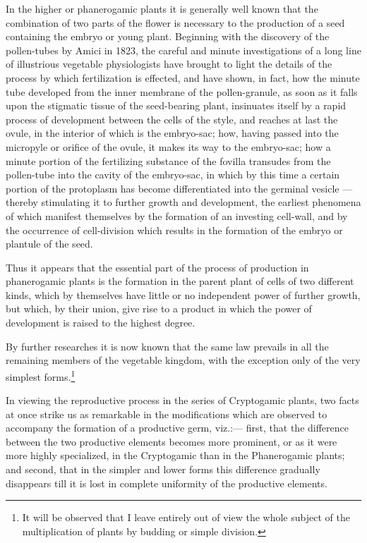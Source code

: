 \documentclass[a4paper, 11pt, oneside, english]{article}
\begin{document}
In the higher or phanerogamic plants it is generally well known that the combination of two parts of the flower is necessary to the production of a seed containing the embryo or young plant. Beginning with the discovery of the pollen-tubes by Amici in 1823, the careful and minute investigations of a long line of illustrious vegetable physiologists have brought to light the details of the process by which fertilization is effected, and have shown, in fact, how the minute tube developed from the inner membrane of the pollen-granule, as soon as it falls upon the stigmatic tissue of the seed-bearing plant, insinuates itself by a rapid process of development between the cells of the style, and reaches at last the ovule, in the interior of which is the embryo-sac; how, having passed into the micropyle or orifice of the ovule, it makes its way to the embryo-sac; how a minute portion of the fertilizing substance of the fovilla transudes from the pollen-tube into the cavity of the embryo-sac, in which by this time a certain portion of the protoplasm has become differentiated into the germinal vesicle --- thereby stimulating it to further growth and development, the earliest phenomena of which manifest themselves by the formation of an investing cell-wall, and by the occurrence of cell-division which results in the formation of the embryo or plantule of the seed.

Thus it appears that the essential part of the process of production in phanerogamic plants is the formation in the parent plant of cells of two different kinds, which by themselves have little or no independent power of further growth, but which, by their union, give rise to a product in which the power of development is raised to the highest degree.

By further researches it is now known that the same law prevails in all the remaining members of the vegetable kingdom, with the exception only of the very simplest forms.\footnote{It will be observed that I leave entirely out of view the whole subject of the multiplication of plants by budding or simple division.}

In viewing the reproductive process in the series of Cryptogamic plants, two facts at once strike us as remarkable in the modifications which are observed to accompany the formation of a productive germ, viz.:--- first, that the difference between the two productive elements becomes more prominent, or as it were more highly specialized, in the Cryptogamic than in the Phanerogamic plants; and second, that in the simpler and lower forms this difference gradually disappears till it is lost in complete uniformity of the productive elements.
\end{document}
